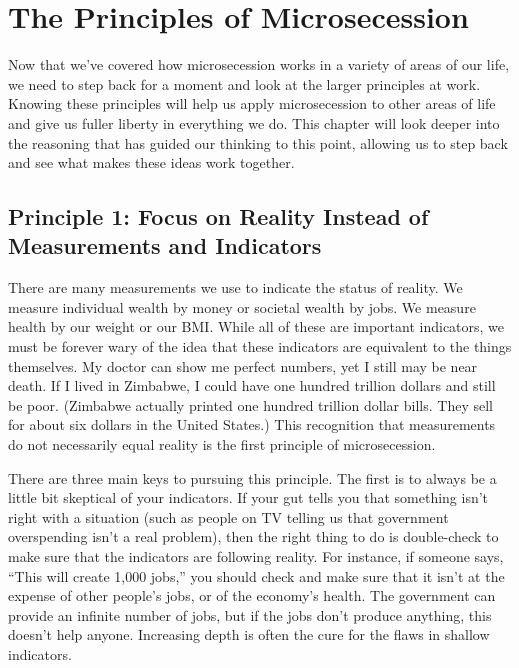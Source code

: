 \chapter{The Principles of Microsecession}

Now that we've covered how microsecession works in a
variety of areas of our life, we need to step back for a moment and
look at the larger principles at work. Knowing these principles will
help us apply microsecession to other areas of life and give us fuller
liberty in everything we do.  This chapter will look deeper into the
reasoning that has guided our thinking to this point, allowing us to step back and
see what makes these ideas work together.

\section{Principle 1: Focus on Reality Instead of Measurements and Indicators}

There are many measurements we use to indicate the status of reality. We
measure individual wealth by money or societal wealth by jobs. We
measure health by our weight or our BMI. While all
of these are important indicators, we must be forever wary
of the idea that
these indicators are equivalent to the things themselves. My doctor can
show me perfect numbers, yet I still may be near death. If I lived in
Zimbabwe, I could have one hundred trillion dollars and still be poor.
(Zimbabwe actually printed one hundred trillion dollar bills. They sell
for about six dollars in the United States.)
This recognition that
measurements do not necessarily equal reality is the first principle of
microsecession.

There are three main keys to pursuing this principle. The first is to
always be a little bit skeptical of your indicators. If your gut tells
you that something isn't right with a situation (such
as people on TV telling us that government overspending
isn't a real problem), then the right thing to do is
double-check to make sure that the indicators are following reality.
For instance, if someone says, ``This will create 1,000 jobs,'' you
should check and make sure that it isn't at the
expense of other people’s jobs, or of the economy's
health. The government can provide an infinite number of jobs, but if
the jobs don't produce anything, this doesn't
help anyone. Increasing depth is often the cure for the flaws in shallow
indicators.

